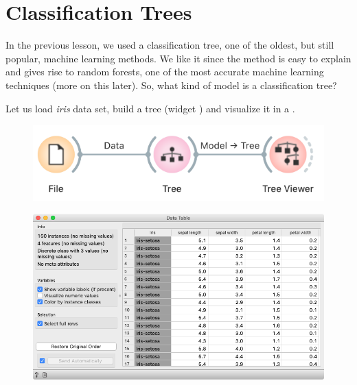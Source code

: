 \chapter{Classification Trees}
\label{ch:classification-trees}

In the previous lesson, we used a classification tree,
one of the oldest, but still popular, machine learning methods. We like it since the method is easy to explain and gives rise to random forests, one of the most accurate machine learning techniques (more on this later). So, what kind of model is a classification tree?

Let us load \textit{iris} data set, build a tree (widget ) and visualize it in a .

\begin{figure}[h]
    \centering
    \includegraphics[scale=0.4]{workflow-tree-viewer.png}
\end{figure}

\begin{figure}[h]
    \vspace{-0.4cm}
    \includegraphics[scale=0.35]{iris-data.png}
    \label{fig:classification-predictions}
\end{figure}

